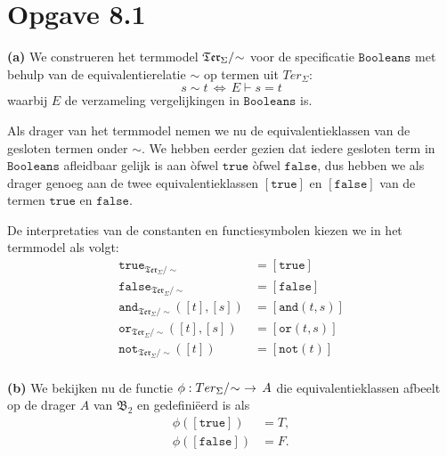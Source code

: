 \documentclass[a4paper,11pt]{article}
\begin{document}
\section*{Opgave 8.1}

\begin{description}

\item{\bf (a)} %
We construeren het termmodel $\mathfrak{Ter}_{\Sigma}/\negmedspace\sim$ voor de
specificatie $\texttt{Booleans}$ met behulp van de equivalentierelatie $\sim$
op termen uit $Ter_{\Sigma}$:
\begin{displaymath}
s \sim t \, \Longleftrightarrow \, E \vdash s = t
\end{displaymath}
waarbij $E$ de verzameling vergelijkingen in $\texttt{Booleans}$ is.

Als drager van het termmodel nemen we nu de equivalentieklassen van de
gesloten termen onder $\sim$. We hebben eerder gezien dat iedere gesloten term
in $\texttt{Booleans}$ afleidbaar gelijk is aan \`ofwel $\texttt{true}$
\`ofwel $\texttt{false}$, dus hebben we als drager genoeg aan de twee
equivalentieklassen $[\texttt{true}]$ en $[\texttt{false}]$ van de termen
$\texttt{true}$ en $\texttt{false}$.

De interpretaties van de constanten en functiesymbolen kiezen we in het
termmodel als volgt:
\begin{align*}
\texttt{true}_{\mathfrak{Ter}_{\Sigma}/\sim}         &= [\texttt{true}] \\
\texttt{false}_{\mathfrak{Ter}_{\Sigma}/\sim}        &= [\texttt{false}] \\
\texttt{and}_{\mathfrak{Ter}_{\Sigma}/\sim}([t],[s]) &= [\texttt{and}(t,s)] \\
\texttt{or}_{\mathfrak{Ter}_{\Sigma}/\sim}([t],[s])  &= [\texttt{or}(t,s)] \\
\texttt{not}_{\mathfrak{Ter}_{\Sigma}/\sim}([t])     &= [\texttt{not}(t)] \\
\end{align*}

\item{\bf (b)} %
We bekijken nu de functie $\phi : Ter_{\Sigma}/\negmedspace\sim \,\,
\rightarrow \, A$ die equivalentieklassen afbeelt op de drager $A$ van
$\mathfrak{B}_{2}$ en gedefini\"eerd is als
\begin{align*}
\phi([\texttt{true}])  &= T, \\
\phi([\texttt{false}]) &= F.
\end{align*}


\end{description}
\end{document}
